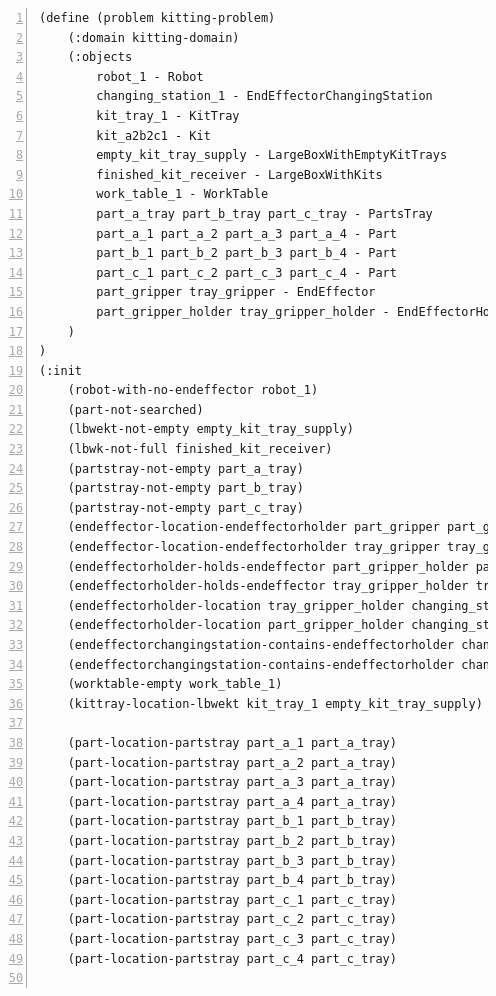 \begin{center}
\begin{minipage}{.5\paperwidth}
\begin{mylisting}
\begin{Verbatim}[commandchars=\\\{\},fontsize=\scriptsize, numbers=left, numbersep=2pt]
(define (problem kitting-problem)
    (:domain kitting-domain)
    (:objects
        robot_1 - Robot
        changing_station_1 - EndEffectorChangingStation
        kit_tray_1 - KitTray
        kit_a2b2c1 - Kit
        empty_kit_tray_supply - LargeBoxWithEmptyKitTrays
        finished_kit_receiver - LargeBoxWithKits
        work_table_1 - WorkTable
        part_a_tray part_b_tray part_c_tray - PartsTray
        part_a_1 part_a_2 part_a_3 part_a_4 - Part
        part_b_1 part_b_2 part_b_3 part_b_4 - Part
        part_c_1 part_c_2 part_c_3 part_c_4 - Part
        part_gripper tray_gripper - EndEffector
        part_gripper_holder tray_gripper_holder - EndEffectorHolder
    )
)
(:init
    (robot-with-no-endeffector robot_1)
    (part-not-searched)
    (lbwekt-not-empty empty_kit_tray_supply)	
    (lbwk-not-full finished_kit_receiver)		
    (partstray-not-empty part_a_tray)
    (partstray-not-empty part_b_tray)
    (partstray-not-empty part_c_tray)
    (endeffector-location-endeffectorholder part_gripper part_gripper_holder)
    (endeffector-location-endeffectorholder tray_gripper tray_gripper_holder)
    (endeffectorholder-holds-endeffector part_gripper_holder part_gripper)
    (endeffectorholder-holds-endeffector tray_gripper_holder tray_gripper)
    (endeffectorholder-location tray_gripper_holder changing_station_1)
    (endeffectorholder-location part_gripper_holder changing_station_1)
    (endeffectorchangingstation-contains-endeffectorholder changing_station_1 tray_gripper_holder)	
    (endeffectorchangingstation-contains-endeffectorholder changing_station_1 part_gripper_holder)
    (worktable-empty work_table_1)
    (kittray-location-lbwekt kit_tray_1 empty_kit_tray_supply)

    (part-location-partstray part_a_1 part_a_tray)
    (part-location-partstray part_a_2 part_a_tray)
    (part-location-partstray part_a_3 part_a_tray)
    (part-location-partstray part_a_4 part_a_tray)
    (part-location-partstray part_b_1 part_b_tray)
    (part-location-partstray part_b_2 part_b_tray)
    (part-location-partstray part_b_3 part_b_tray)
    (part-location-partstray part_b_4 part_b_tray)
    (part-location-partstray part_c_1 part_c_tray)
    (part-location-partstray part_c_2 part_c_tray)
    (part-location-partstray part_c_3 part_c_tray)
    (part-location-partstray part_c_4 part_c_tray)
	

\end{Verbatim}
\end{mylisting}
\end{minipage}
\end{center}
